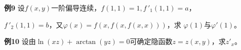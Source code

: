 \begin{frame}
	\linespread{1.2}
	\begin{exampleblock}{{\bf 例9}\hfill}
		设$f(x,y)$一阶偏导连续，$f(1,1)=1,f\,'_1(1,1)=a$，
		
		$f\,'_2(1,1)=b$，又$\varphi(x)=f(x,f(x,f(x,x)))$，求
		$\varphi(1)$与$\varphi'(1)$。
	\end{exampleblock}
	\bigskip\pause 
	\begin{exampleblock}{{\bf 例10}\hfill}
		设由$\ln(xz)+\arctan(yz)=0$可确定隐函数$z=z(x,y)$，求$z'_x$。
	\end{exampleblock}
\end{frame}

 

